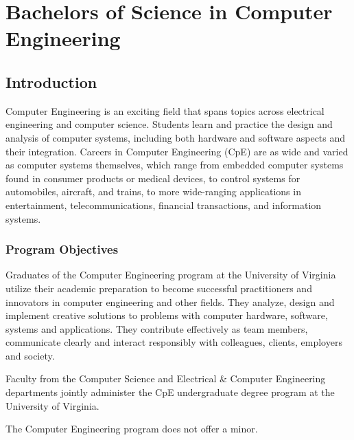 \documentclass[10pt,letter]{book}
\newcommand{\mychapter}[2]{\chapter{#1}\renewcommand{\leftmark}{\textsc{#2}}}
\newcommand{\mysection}[1]{\section{#1}\renewcommand{\rightmark}{#1}}
\begin{document}
\clearpage
\mychapter{Bachelors of Science in Computer Engineering}{BS CpE Degree}

\mysection{Introduction}

Computer Engineering is an exciting field that spans topics across
electrical engineering and computer science.  Students learn and
practice the design and analysis of computer systems, including both
hardware and software aspects and their integration. Careers in
Computer Engineering (CpE) are as wide and varied as computer systems
themselves, which range from embedded computer systems found in
consumer products or medical devices, to control systems for
automobiles, aircraft, and trains, to more wide-ranging applications
in entertainment, telecommunications, financial transactions, and
information systems.


\subsection{Program Objectives}

Graduates of the Computer Engineering program at the
University of Virginia utilize their academic preparation
to become successful practitioners and innovators in
computer engineering and other fields. They analyze,
design and implement creative solutions to problems
with computer hardware, software, systems and
applications. They contribute effectively as team
members, communicate clearly and interact responsibly
with colleagues, clients, employers and society.

Faculty from the Computer Science and Electrical \& Computer
Engineering departments jointly administer the CpE undergraduate
degree program at the University of Virginia.

The Computer Engineering program does not offer a minor.

\end{document}
